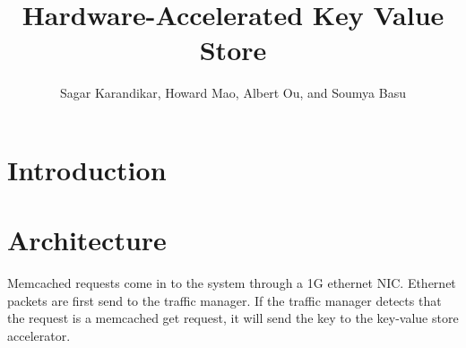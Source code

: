 \documentclass{article}
\title{Hardware-Accelerated Key Value Store}
\author{Sagar Karandikar, Howard Mao, Albert Ou, and Soumya Basu}
\begin{document}
\maketitle

\section{Introduction}

\section{Architecture}

Memcached requests come in to the system through a 1G ethernet NIC.
Ethernet packets are first send to the traffic manager. If the traffic manager
detects that the request is a memcached get request, it will send the key to
the key-value store accelerator.


\end{document}

